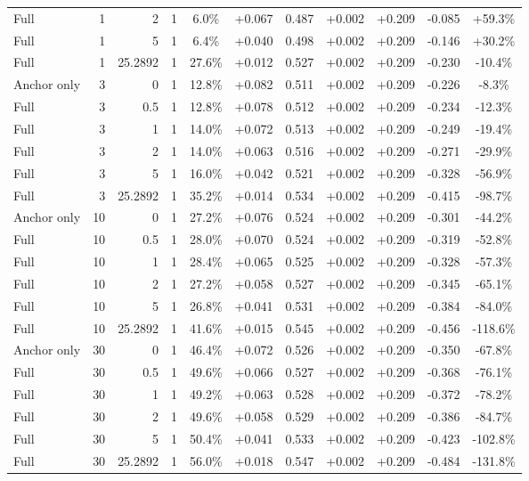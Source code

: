 \begin{table}[htbp]
\begin{tabular}{lrrrccccccc}
Full & 1 & 2 & 1 & 6.0\% & +0.067 & 0.487 & +0.002 & +0.209 & -0.085 & +59.3\% \\
Full & 1 & 5 & 1 & 6.4\% & +0.040 & 0.498 & +0.002 & +0.209 & -0.146 & +30.2\% \\
Full & 1 & 25.2892 & 1 & 27.6\% & +0.012 & 0.527 & +0.002 & +0.209 & -0.230 & -10.4\% \\
Anchor only & 3 & 0 & 1 & 12.8\% & +0.082 & 0.511 & +0.002 & +0.209 & -0.226 & -8.3\% \\
Full & 3 & 0.5 & 1 & 12.8\% & +0.078 & 0.512 & +0.002 & +0.209 & -0.234 & -12.3\% \\
Full & 3 & 1 & 1 & 14.0\% & +0.072 & 0.513 & +0.002 & +0.209 & -0.249 & -19.4\% \\
Full & 3 & 2 & 1 & 14.0\% & +0.063 & 0.516 & +0.002 & +0.209 & -0.271 & -29.9\% \\
Full & 3 & 5 & 1 & 16.0\% & +0.042 & 0.521 & +0.002 & +0.209 & -0.328 & -56.9\% \\
Full & 3 & 25.2892 & 1 & 35.2\% & +0.014 & 0.534 & +0.002 & +0.209 & -0.415 & -98.7\% \\
Anchor only & 10 & 0 & 1 & 27.2\% & +0.076 & 0.524 & +0.002 & +0.209 & -0.301 & -44.2\% \\
Full & 10 & 0.5 & 1 & 28.0\% & +0.070 & 0.524 & +0.002 & +0.209 & -0.319 & -52.8\% \\
Full & 10 & 1 & 1 & 28.4\% & +0.065 & 0.525 & +0.002 & +0.209 & -0.328 & -57.3\% \\
Full & 10 & 2 & 1 & 27.2\% & +0.058 & 0.527 & +0.002 & +0.209 & -0.345 & -65.1\% \\
Full & 10 & 5 & 1 & 26.8\% & +0.041 & 0.531 & +0.002 & +0.209 & -0.384 & -84.0\% \\
Full & 10 & 25.2892 & 1 & 41.6\% & +0.015 & 0.545 & +0.002 & +0.209 & -0.456 & -118.6\% \\
Anchor only & 30 & 0 & 1 & 46.4\% & +0.072 & 0.526 & +0.002 & +0.209 & -0.350 & -67.8\% \\
Full & 30 & 0.5 & 1 & 49.6\% & +0.066 & 0.527 & +0.002 & +0.209 & -0.368 & -76.1\% \\
Full & 30 & 1 & 1 & 49.2\% & +0.063 & 0.528 & +0.002 & +0.209 & -0.372 & -78.2\% \\
Full & 30 & 2 & 1 & 49.6\% & +0.058 & 0.529 & +0.002 & +0.209 & -0.386 & -84.7\% \\
Full & 30 & 5 & 1 & 50.4\% & +0.041 & 0.533 & +0.002 & +0.209 & -0.423 & -102.8\% \\
Full & 30 & 25.2892 & 1 & 56.0\% & +0.018 & 0.547 & +0.002 & +0.209 & -0.484 & -131.8\% \\

\end{tabular}
\end{table}
